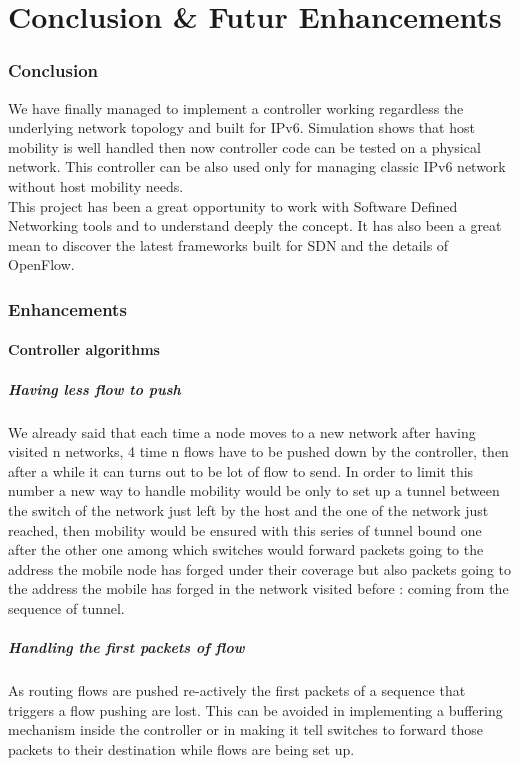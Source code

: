 \documentclass{article}
\begin{document}
\part{Conclusion \& Futur Enhancements}

\section{Conclusion}

We have finally managed to implement a controller working regardless
the underlying network topology and built for IPv6. Simulation shows
that host mobility is well handled then now controller code can be
tested on a physical network. This controller can be also used only for
managing classic IPv6 network without host mobility needs.\\
\newline
This project has been a great opportunity to work with Software
Defined Networking tools and to understand deeply the concept. It has
also been a great mean to discover the latest frameworks built for SDN
and the details of OpenFlow.

\section{Enhancements}

\subsection{Controller algorithms}

\subsubsection{Having less flow to push}
We already said that each time a node moves to a new network after
having visited n networks, 4 time n flows have to be pushed down by
the controller, then after a while it can turns out to be lot of flow
to send. In order to limit this number a new way to handle mobility
would be only to set up a tunnel between the switch of the network
just left by the host and the one of the network just reached, then
mobility would be ensured with this series of tunnel bound one after
the other one among which switches would forward packets going to the
address the mobile node has forged under their coverage but also
packets going to the address the mobile has forged in the network
visited before : coming from the sequence of tunnel.

\subsubsection{Handling the first packets of flow}
As routing flows are pushed re-actively the first packets of a sequence
that triggers a flow pushing are lost. This can be avoided in
implementing a buffering mechanism inside the controller or in making
it tell switches to forward those packets to their destination
while flows are being set up.
\end{document}
